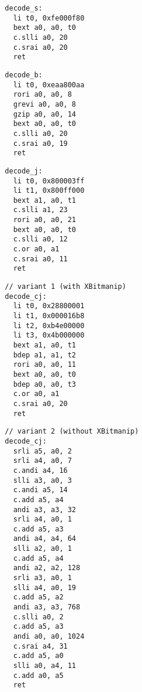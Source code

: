 \begin{multicols}{2}
\begin{minipage}{\linewidth}
\begin{verbatim}
  decode_s:
    li t0, 0xfe000f80
    bext a0, a0, t0
    c.slli a0, 20
    c.srai a0, 20
    ret
\end{verbatim}
\end{minipage}

\begin{minipage}{\linewidth}
\begin{verbatim}
  decode_b:
    li t0, 0xeaa800aa
    rori a0, a0, 8
    grevi a0, a0, 8
    gzip a0, a0, 14
    bext a0, a0, t0
    c.slli a0, 20
    c.srai a0, 19
    ret
\end{verbatim}
\end{minipage}

\begin{minipage}{\linewidth}
\begin{verbatim}
  decode_j:
    li t0, 0x800003ff
    li t1, 0x800ff000
    bext a1, a0, t1
    c.slli a1, 23
    rori a0, a0, 21
    bext a0, a0, t0
    c.slli a0, 12
    c.or a0, a1
    c.srai a0, 11
    ret
\end{verbatim}
\end{minipage}

\begin{minipage}{\linewidth}
\begin{verbatim}
  // variant 1 (with XBitmanip)
  decode_cj:
    li t0, 0x28800001
    li t1, 0x000016b8
    li t2, 0xb4e00000
    li t3, 0x4b000000
    bext a1, a0, t1
    bdep a1, a1, t2
    rori a0, a0, 11
    bext a0, a0, t0
    bdep a0, a0, t3
    c.or a0, a1
    c.srai a0, 20
    ret
\end{verbatim}
\end{minipage}

\begin{minipage}{\linewidth}
\begin{verbatim}
  // variant 2 (without XBitmanip)
  decode_cj:
    srli a5, a0, 2
    srli a4, a0, 7
    c.andi a4, 16
    slli a3, a0, 3
    c.andi a5, 14
    c.add a5, a4
    andi a3, a3, 32
    srli a4, a0, 1
    c.add a5, a3
    andi a4, a4, 64
    slli a2, a0, 1
    c.add a5, a4
    andi a2, a2, 128
    srli a3, a0, 1
    slli a4, a0, 19
    c.add a5, a2
    andi a3, a3, 768
    c.slli a0, 2
    c.add a5, a3
    andi a0, a0, 1024
    c.srai a4, 31
    c.add a5, a0
    slli a0, a4, 11
    c.add a0, a5
    ret
\end{verbatim}
\end{minipage}
\end{multicols}

